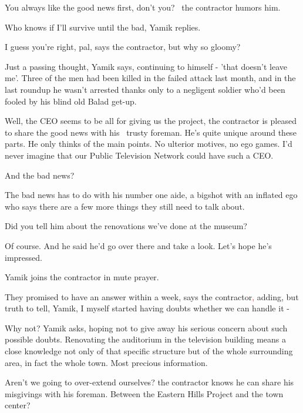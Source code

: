\documentclass[letterpaper]{article}
\begin{document}
{\textquotedbl}You always like the good news first, don't you?{\textquotedbl} \ the contractor humors him. 

{\textquotedbl}Who knows if I'll survive until the bad,{\textquotedbl} Yamik replies.\textcolor{red}{ }

{\textquotedbl}I guess you're right, pal,{\textquotedbl} says the contractor, {\textquotedbl}but why so
gloomy?{\textquotedbl} 

{\textquotedbl}Just a passing thought,{\textquotedbl} Yamik says, continuing to himself - 'that doesn't leave me'. Three
of the men had been killed in the failed attack last month, and in the last roundup he wasn't arrested thanks only to a
negligent soldier who'd been fooled by his blind old Balad get-up. 

{\textquotedbl}Well, the CEO seems to be all for giving us the project,{\textquotedbl} the contractor is pleased to
share the good news with his \ trusty foreman. {\textquotedbl}He's quite unique around these parts. He only thinks of
the main points. No ulterior motives, no ego games. I'd never imagine that our Public Television Network could have
such a CEO.{\textquotedbl}

{\textquotedbl}And the bad news?{\textquotedbl} 

{\textquotedbl}The bad news has to do with his number one aide, a bigshot with an inflated ego who says there are a few
more things they still need to talk about.{\textquotedbl} 

{\textquotedbl}Did you tell him about the renovations we've done at the museum?{\textquotedbl} 

{\textquotedbl}Of course. And he said he'd go over there and take a look. Let's hope he's impressed.{\textquotedbl} 

Yamik joins the contractor in mute prayer. 

{\textquotedbl}They promised to have an answer within a week,{\textquotedbl} says the contractor\textcolor{red}{,}
adding, {\textquotedbl}but truth to tell, Yamik, I myself started having doubts whether we can handle it
-{\textquotedbl} 

{\textquotedbl}Why not?{\textquotedbl} Yamik asks, hoping not to give away his serious\textcolor{red}{ }concern about
such possible doubts. Renovating the auditorium in the television building means a close knowledge not only of that
specific structure but of the whole surrounding area, in fact the whole town. Most precious information. ~

{\textquotedbl}Aren't we going to over-extend ourselves?{\textquotedbl} the contractor knows he can share his misgivings
with his foreman. {\textquotedbl}Between the Eastern Hills Project and the town center?{\textquotedbl} 
\end{document}
